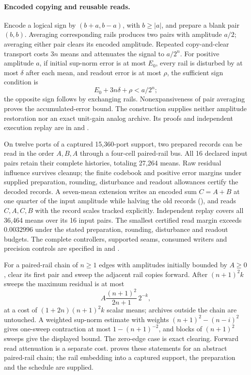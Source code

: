 \paragraph{Encoded copying and reusable reads.}
Encode a logical sign by $(b+a,b-a)$, with $b\geq |a|$, and prepare a blank
pair $(b,b)$. Averaging corresponding rails produces two pairs with
amplitude $a/2$; averaging either pair clears its encoded amplitude.
Repeated copy-and-clear transport costs $3n$ means and attenuates the signal
to $a/2^n$. For positive amplitude $a$, if initial sup-norm error is at most
$E_0$, every rail is disturbed by at most $\delta$ after each mean, and
readout error is at most $\rho$, the sufficient sign condition is
\[
 E_0+3n\delta+\rho<a/2^n;
\]
the opposite sign follows by exchanging rails. Nonexpansiveness of pair averaging proves the accumulated-error bound.
The construction supplies neither amplitude restoration nor an exact
unit-gain analog archive. Its proofs and independent execution replay are
in  and
.

On twelve ports of a captured 15,360-port support, two prepared records can be read in the
order $A,B,A$ through a four-cell paired-rail bus. All 16 declared input
pairs retain their complete histories, totaling 27,264 means. Raw residual
influence survives cleanup; the finite codebook and positive error margins
under supplied preparation, rounding, disturbance and readout allowances
certify the decoded records. A seven-mean extension writes an encoded sum $C=A+B$ at one quarter of the
input amplitude while halving the old records
(), and reads $C,A,C,B$ with
the record scales tracked explicitly. Independent replay covers all 36,464 means over its 16 input pairs.
The smallest certified read margin exceeds $0.0032996$ under the stated
preparation, rounding, disturbance and readout budgets. The complete
controllers, supported seams, consumed writers and precision controls are
specified in  and
.

For a paired-rail chain of $n\geq1$ edges with amplitudes initially bounded by
$A\geq0$, clear its first pair and sweep the adjacent rail copies forward.
After $(n+1)^2 k$ sweeps the maximum residual is at most
\[
 A\frac{(n+1)^2}{2n+1}\,2^{-k},
\]
at a cost of $(1+2n)(n+1)^2 k$ scalar means; archives outside the chain are
untouched. A weighted sup-norm estimate with weights
$(n+1)^2-(n-i)^2$ gives one-sweep contraction at most
$1-(n+1)^{-2}$, and blocks of $(n+1)^2$ sweeps give the displayed bound.
The zero-edge case is exact clearing. Forward read attenuation is a separate
cost.  proves these statements for an
abstract paired-rail chain; the rail embedding into a captured support, the
preparation and the schedule are supplied.

